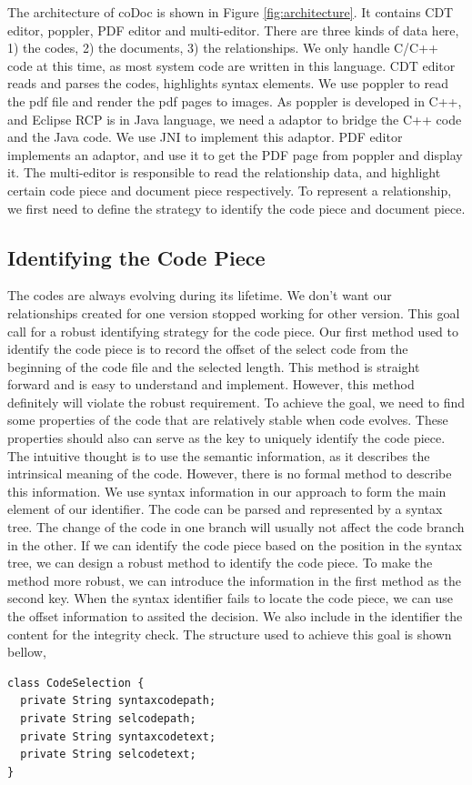 \documentclass[11pt,letterpaper,oneside]{article}
\begin{document}
The architecture of coDoc is shown in Figure \ref{fig:architecture}. 
It contains CDT editor, poppler, PDF editor and multi-editor.
There are three kinds of data here, 1) the codes, 2) the documents, 3) the relationships.
We only handle C/C++ code at this time, 
as most system code are written in this language.
CDT editor reads and parses the codes, 
highlights syntax elements.
We use poppler to read the pdf file and render the pdf pages to images.
As poppler is developed in C++, and Eclipse RCP is in Java language,
we need a adaptor to bridge the C++ code and the Java code.
We use JNI to implement this adaptor.
PDF editor implements an adaptor, 
and use it to get the PDF page from poppler and display it.
The multi-editor is responsible to read the relationship data,
and highlight certain code piece and document piece respectively.
To represent a relationship, 
we first need to define the strategy to identify the code piece and document piece.


\subsection{Identifying the Code Piece}
The codes are always evolving during its lifetime.
We don't want our relationships created for one version stopped working for other version.
This goal call for a robust identifying strategy for the code piece.
Our first method used to identify the code piece is to record the offset of the select code from the beginning of the code file and the selected length.
This method is straight forward and is easy to understand and implement.
However, this method definitely will violate the robust requirement.
To achieve the goal, we need to find some properties of the code that are relatively stable when code evolves.
These properties should also can serve as the key to uniquely identify the code piece.
The intuitive thought is to use the semantic information,
as it describes the intrinsical meaning of the code.
However, there is no formal method to describe this information.
We use syntax information in our approach to form the main element of our identifier.
The code can be parsed and represented by a syntax tree.
The change of the code in one branch will usually not affect the code branch in the other.
If we can identify the code piece based on the position in the syntax tree,
we can design a robust method to identify the code piece.
To make the method more robust,
we can introduce the information in the first method as the second key.
When the syntax identifier fails to locate the code piece,
we can use the offset information to assited the decision.
We also include in the identifier the content for the integrity check.
The structure used to achieve this goal is shown bellow,
\begin{Verbatim}[frame=single]
class CodeSelection {
  private String syntaxcodepath;
  private String selcodepath;
  private String syntaxcodetext;
  private String selcodetext;
}
\end{Verbatim}
\end{document}
